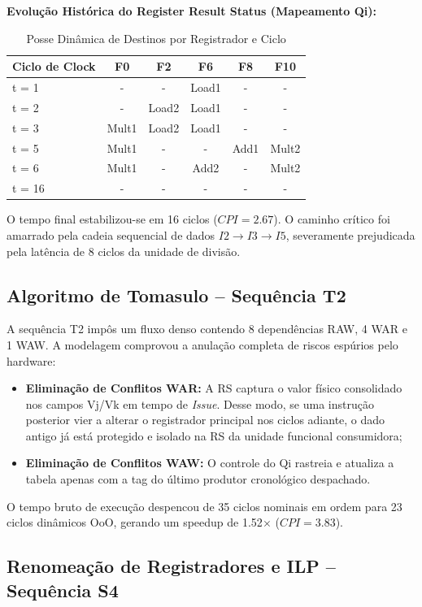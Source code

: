 \documentclass[12pt,a4paper]{article}
\begin{document}
\textbf{Evolução Histórica do Register Result Status (Mapeamento Qi):}
\begin{table}[H]
\centering
\caption{Posse Dinâmica de Destinos por Registrador e Ciclo}
\begin{tabular}{@{}lccccc@{}}
\toprule
\textbf{Ciclo de Clock} & \textbf{F0} & \textbf{F2} & \textbf{F6} & \textbf{F8} & \textbf{F10} \\ \midrule
t = 1 & -     & -     & Load1 & -    & -     \\
t = 2 & -     & Load2 & Load1 & -    & -     \\
t = 3 & Mult1 & Load2 & Load1 & -    & -     \\
t = 5 & Mult1 & -     & -     & Add1 & Mult2 \\
t = 6 & Mult1 & -     & Add2  & -    & Mult2 \\
t = 16 & -     & -     & -     & -    & -     \\ \bottomrule
\end{tabular}
\end{table}

O tempo final estabilizou-se em 16 ciclos ($CPI = 2.67$). O caminho crítico foi amarrado pela cadeia sequencial de dados $I2 \rightarrow I3 \rightarrow I5$, severamente prejudicada pela latência de 8 ciclos da unidade de divisão.

\subsection{Algoritmo de Tomasulo -- Sequência T2}
A sequência T2 impôs um fluxo denso contendo 8 dependências RAW, 4 WAR e 1 WAW. A modelagem comprovou a anulação completa de riscos espúrios pelo hardware:
\begin{itemize}
    \item \textbf{Eliminação de Conflitos WAR:} A RS captura o valor físico consolidado nos campos Vj/Vk em tempo de \textit{Issue}. Desse modo, se uma instrução posterior vier a alterar o registrador principal nos ciclos adiante, o dado antigo já está protegido e isolado na RS da unidade funcional consumidora;
    \item \textbf{Eliminação de Conflitos WAW:} O controle do Qi rastreia e atualiza a tabela apenas com a tag do último produtor cronológico despachado.
\end{itemize}
O tempo bruto de execução despencou de 35 ciclos nominais em ordem para 23 ciclos dinâmicos OoO, gerando um speedup de 1.52$\times$ ($CPI = 3.83$).

\subsection{Renomeação de Registradores e ILP -- Sequência S4}
\end{document}
